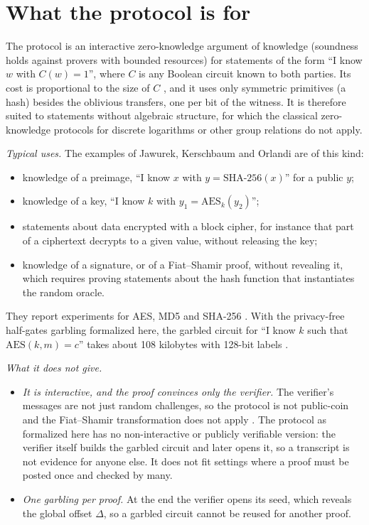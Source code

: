 \section*{What the protocol is for}

The protocol is an interactive zero-knowledge argument of knowledge (soundness holds against
provers with bounded resources) for statements of the form ``I
know $w$ with $C(w) = 1$'', where $C$ is any Boolean circuit known to both parties. Its cost is
proportional to the size of $C$ \cite[Sect.~1]{JKO13}, and it uses only symmetric primitives (a hash) besides the
oblivious transfers, one per bit of the witness. It is therefore suited to statements without
algebraic structure, for which the classical zero-knowledge protocols for discrete logarithms or
other group relations do not apply.

\emph{Typical uses.} The examples of Jawurek, Kerschbaum and Orlandi \cite[Sect.~1 and~1.1]{JKO13}
are of this kind:
\begin{itemize}
  \item knowledge of a preimage, ``I know $x$ with $y = \mathrm{SHA\text{-}256}(x)$'' for a public
  $y$;
  \item knowledge of a key, ``I know $k$ with $y_1 = \mathrm{AES}_k(y_2)$'';
  \item statements about data encrypted with a block cipher, for instance that part of a
  ciphertext decrypts to a given value, without releasing the key;
  \item knowledge of a signature, or of a Fiat--Shamir proof, without revealing it, which requires
  proving statements about the hash function that instantiates the random oracle.
\end{itemize}
They report experiments for AES, MD5 and SHA-256 \cite[Sect.~5.2]{JKO13}. With the privacy-free
half-gates garbling formalized here, the garbled circuit for ``I know $k$ such that
$\mathrm{AES}(k, m) = c$'' takes about 108 kilobytes with 128-bit labels \cite[Sect.~6]{ZRE15}.

\emph{What it does not give.}
\begin{itemize}
  \item \emph{It is interactive, and the proof convinces only the verifier.} The verifier's
  messages are not just random challenges, so the protocol is not public-coin and the Fiat--Shamir
  transformation does not apply \cite[Sect.~3, footnote~6]{JKO13}. The protocol as formalized here
  has no non-interactive or publicly verifiable version: the verifier itself builds the garbled circuit and later opens it,
  so a transcript is not evidence for anyone else. It does not fit settings where a proof must be
  posted once and checked by many.
  \item \emph{One garbling per proof.} At the end the verifier opens its seed, which reveals the
  global offset $\Delta$, so a garbled circuit cannot be reused for another proof.
\end{itemize}

